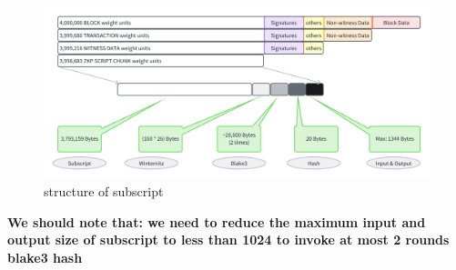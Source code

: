\begin{figure}[ht] 
    \centering  
    \includegraphics[width=0.85\columnwidth]{images/structure-of-subscript.png} 
    \caption{structure of subscript}
    \label{fig:structure of subscript}
\end{figure}

\textbf{We should note that: we need to reduce the maximum input and output size of subscript to less than 1024 to invoke at most 2 rounds blake3 \cite{website:blake3} hash}
